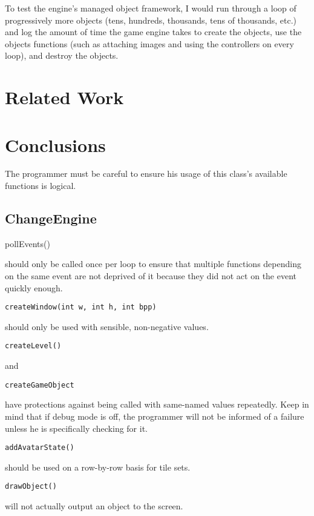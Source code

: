 \documentclass[12pt]{article}
\begin{document}
    To test the engine's managed object framework, I would run through a loop of progressively more objects (tens, hundreds, thousands, tens of thousands, etc.) and log the amount of time the game engine takes to create the objects, use the objects functions (such as attaching images and using the controllers on every loop), and destroy the objects.

  \section{Related Work}

  \section{Conclusions}
    The programmer must be careful to ensure his usage of this class's available functions is logical.
\subsection{ChangeEngine}
\begin{verbatim*}pollEvents()\end{verbatim*} should only be called once per loop to ensure that multiple functions depending on the same event are not deprived of it because they did not act on the event quickly enough.
\\

\begin{verbatim}createWindow(int w, int h, int bpp)\end{verbatim} should only be used with sensible, non-negative values.
\\

\begin{verbatim}createLevel()\end{verbatim} and \begin{verbatim}createGameObject\end{verbatim} have protections against being called with same-named values repeatedly. Keep in mind that if debug mode is off, the programmer will not be informed of a failure unless he is specifically checking for it.
\\

\begin{verbatim}addAvatarState()\end{verbatim} should be used on a row-by-row basis for tile sets.
\\

\begin{verbatim}drawObject()\end{verbatim} will not actually output an object to the screen.
\\
\end{document}
